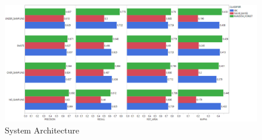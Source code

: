 \documentclass[sigconf]{acmart}
\begin{document}
 


\begin{figure}[h]
  \centering
  \includegraphics[width=\linewidth]{1 - BOOKKEEPER - SamplingNoFeatureSelection}
  \caption{System Architecture}
  \label{fig:BOOKKEEPER:SamplingNoFeatureSelection}
\end{figure}









\end{document}
